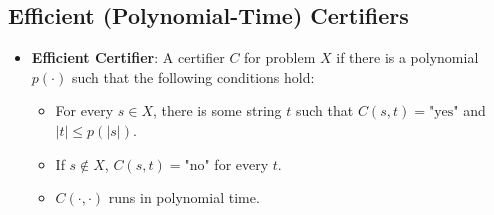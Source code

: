 \subsection{Efficient (Polynomial-Time) Certifiers}
\begin{itemize}
    \item \textbf{Efficient Certifier}: A certifier $C$ for problem $X$ if there is a polynomial $p(\cdot)$ such that the following conditions hold:
    \begin{itemize}
        \item For every $s \in X$, there is some string $t$ such that $C(s, t) = \text{"yes"}$ and $\left| t \right| \leq p(\left| s \right|)$.
        \item If $s \notin X$, $C(s, t) = \text{"no"}$ for every $t$.
        \item $C(\cdot, \cdot)$ runs in polynomial time.
    \end{itemize}
\end{itemize}

